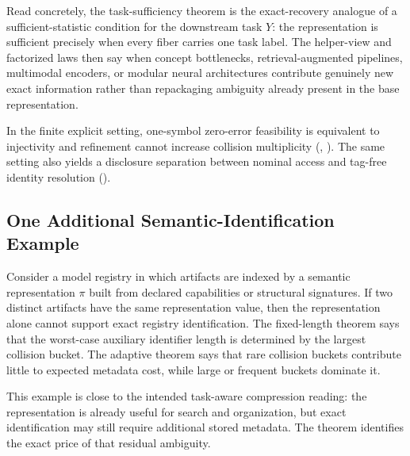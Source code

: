Read concretely, the task-sufficiency theorem is the exact-recovery analogue of a sufficient-statistic condition for the downstream task $Y$: the representation is sufficient precisely when every fiber carries one task label. The helper-view and factorized laws then say when concept bottlenecks, retrieval-augmented pipelines, multimodal encoders, or modular neural architectures contribute genuinely new exact information rather than repackaging ambiguity already present in the base representation.

In the finite explicit setting, one-symbol zero-error feasibility is equivalent to injectivity and refinement cannot increase collision multiplicity (, ). The same setting also yields a disclosure separation between nominal access and tag-free identity resolution ().

\subsection{One Additional Semantic-Identification Example}

Consider a model registry in which artifacts are indexed by a semantic representation $\pi$ built from declared capabilities or structural signatures. If two distinct artifacts have the same representation value, then the representation alone cannot support exact registry identification. The fixed-length theorem says that the worst-case auxiliary identifier length is determined by the largest collision bucket. The adaptive theorem says that rare collision buckets contribute little to expected metadata cost, while large or frequent buckets dominate it.

This example is close to the intended task-aware compression reading: the representation is already useful for search and organization, but exact identification may still require additional stored metadata. The theorem identifies the exact price of that residual ambiguity.
